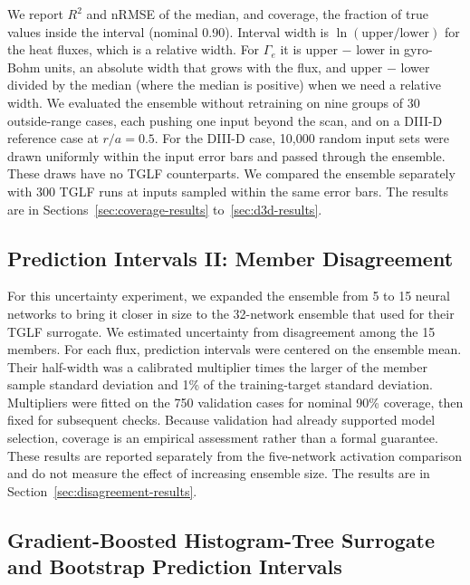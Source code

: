 \documentclass[12pt,letterpaper]{article}
\begin{document}
We report $R^2$ and nRMSE of the median, and coverage, the fraction of true
values inside the interval (nominal 0.90). Interval width is $\ln(\text{upper}
  / \text{lower})$ for the heat fluxes, which is a relative width. For
$\Gamma_e$ it is upper $-$ lower in gyro-Bohm units, an absolute width that
grows with the flux, and upper $-$ lower divided by the median (where the
median is positive) when we need a relative width. We evaluated the ensemble
without retraining on nine groups of 30 outside-range cases, each pushing one
input beyond the scan, and on a DIII-D reference case at $r/a = 0.5$. For the
DIII-D case, 10,000 random input sets were drawn uniformly within the input
error bars and passed through the ensemble. These draws have no TGLF
counterparts. We compared the ensemble separately with 300 TGLF runs at inputs
sampled within the same error bars. The results are in
Sections~\ref{sec:coverage-results} to~\ref{sec:d3d-results}.

\subsection{Prediction Intervals II: Member Disagreement}
\label{sec:disagreement-methods}

For this uncertainty experiment, we expanded the ensemble from 5 to 15 neural
networks to bring it closer in size to the 32-network ensemble that
\citet[Section~3.1]{meneghini2017} used for their TGLF surrogate. We estimated
uncertainty from disagreement among the 15 members.
For each flux, prediction intervals were centered on the ensemble mean. Their
half-width was a calibrated multiplier times the larger of the member sample
standard deviation and 1\% of the training-target standard deviation.
Multipliers were fitted on the 750 validation cases for nominal 90\% coverage,
then fixed for subsequent checks. Because validation had already supported
model selection, coverage is an empirical assessment rather than a formal
guarantee. These results are reported separately from the five-network
activation comparison and do not measure the effect of increasing ensemble size.
The results are in Section~\ref{sec:disagreement-results}.

\subsection{Gradient-Boosted Histogram-Tree Surrogate and Bootstrap Prediction Intervals}
\label{sec:gbdt-methods}
\end{document}
